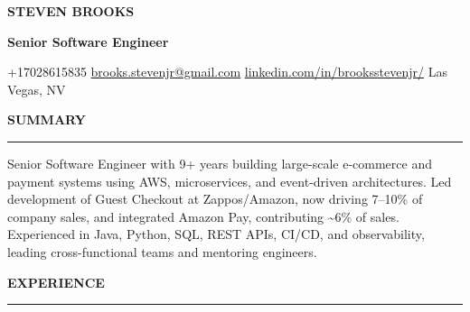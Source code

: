 \documentclass[11pt, letterpaper]{article}
\newcommand{\ressection}[1]{%
  \vspace{10pt}%
  {\large\bfseries\color{darkred}\MakeUppercase{#1}}\\[-8pt]%
  {\color{rulegray}\rule{\linewidth}{0.4pt}}%
  \vspace{1pt}\par%
}
\begin{document}
{\fontsize{22pt}{24pt}\selectfont\bfseries\color{darkred}STEVEN BROOKS}\par\vspace{1pt}
{\large\bfseries\color{accentorange}Senior Software Engineer}\par\vspace{3pt}
{\small\color{textgray}%
  \faPhone\;+17028615835\enspace
  \faEnvelope\;\href{mailto:brooks.stevenjr@gmail.com}{brooks.stevenjr@gmail.com}\enspace
  \faLink\;\href{https://linkedin.com/in/brooksstevenjr/}{linkedin.com/in/brooksstevenjr/}\enspace
  \faMapMarker\;Las Vegas, NV%
}\par\vspace{4pt}

\ressection{Summary}
{\small\color{textgray}%
Senior Software Engineer with 9+ years building large-scale e-commerce and payment systems using AWS, microservices, and event-driven architectures. Led development of Guest Checkout at Zappos/Amazon, now driving 7--10\% of company sales, and integrated Amazon Pay, contributing \textasciitilde6\% of sales. Experienced in Java, Python, SQL, REST APIs, CI/CD, and observability, leading cross-functional teams and mentoring engineers.}\par

\ressection{Experience}
\end{document}
